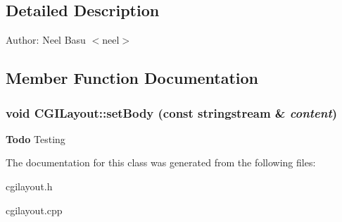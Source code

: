 \subsection{Detailed Description}
\begin{Desc}
\item[Author:]Neel Basu $<$neel$>$ \end{Desc}


\subsection{Member Function Documentation}
\subsubsection[setBody]{\setlength{\rightskip}{0pt plus 5cm}void CGILayout::setBody (const stringstream \& {\em content})}\label{classCGILayout_18ae9f151e6e6c5603a24af24d2d9bea}




\begin{Desc}
\item[{\bf Todo}]Testing \end{Desc}


The documentation for this class was generated from the following files:\begin{CompactItemize}
\item 
cgilayout.h\item 
cgilayout.cpp\end{CompactItemize}
